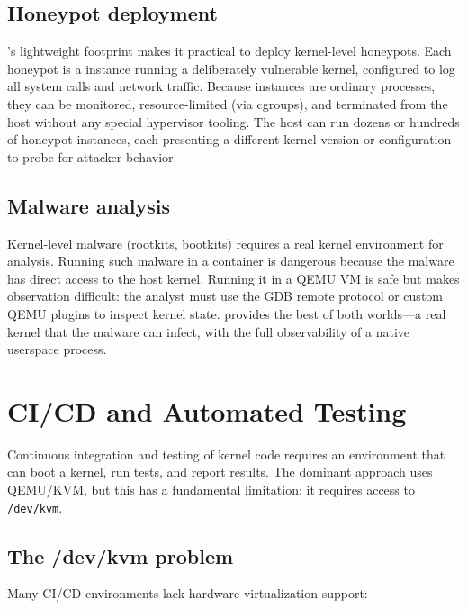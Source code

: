 \subsection{Honeypot deployment}

\UML{}'s lightweight footprint makes it practical to deploy
kernel-level honeypots.  Each honeypot is a \UML{} instance running
a deliberately vulnerable kernel, configured to log all system calls
and network traffic.  Because \UML{} instances are ordinary processes,
they can be monitored, resource-limited (via cgroups), and terminated
from the host without any special hypervisor tooling.  The host can
run dozens or hundreds of honeypot instances, each presenting a
different kernel version or configuration to probe for attacker
behavior.

\subsection{Malware analysis}

Kernel-level malware (rootkits, bootkits) requires a real kernel
environment for analysis.  Running such malware in a container is
dangerous because the malware has direct access to the host kernel.
Running it in a QEMU VM is safe but makes observation difficult:
the analyst must use the GDB remote protocol or custom QEMU plugins
to inspect kernel state.  \UML{} provides the best of both
worlds---a real kernel that the malware can infect, with the full
observability of a native userspace process.


\section{CI/CD and Automated Testing}
\label{sec:app-cicd}

Continuous integration and testing of kernel code requires an
environment that can boot a kernel, run tests, and report results.
The dominant approach uses QEMU/KVM, but this has a fundamental
limitation: it requires access to \texttt{/dev/kvm}.

\subsection{The /dev/kvm problem}

Many CI/CD environments lack hardware virtualization support:

